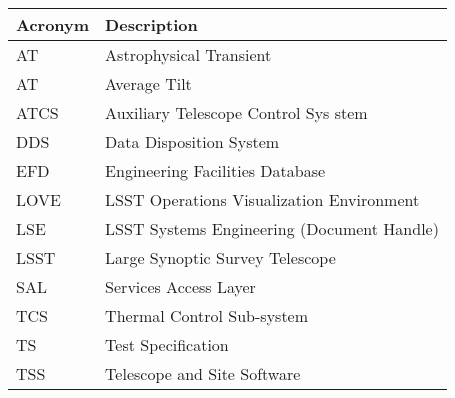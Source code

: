 \addtocounter{table}{-1}
\begin{longtable}{|l|p{}|}\hline
\textbf{Acronym} & \textbf{Description}  \\\hline

AT & Astrophysical Transient \\\hline
AT & Average Tilt \\\hline
ATCS & Auxiliary Telescope Control Sys stem \\\hline
DDS & Data Disposition System \\\hline
EFD & Engineering Facilities Database \\\hline
LOVE & LSST Operations Visualization Environment \\\hline
LSE & LSST Systems Engineering (Document Handle) \\\hline
LSST & Large Synoptic Survey Telescope \\\hline
SAL & Services Access Layer \\\hline
TCS & Thermal Control Sub-system \\\hline
TS & Test Specification \\\hline
TSS & Telescope and Site Software \\\hline
\end{longtable}
